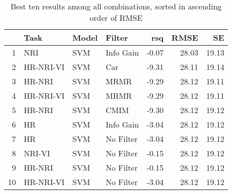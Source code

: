 \begin{table}[ht!]
\centering
\caption{Best ten results among all combinations, sorted in ascending order of RMSE} 
\label{tab:perf-top-10}
\begin{tabular}{rlllrrr}
  \hline
 & Task & Model & Filter & rsq & RMSE & SE \\ 
  \hline
1 & NRI & SVM & Info Gain & -0.07 & 28.03 & 19.13 \\ 
  2 & HR-NRI-VI & SVM & Car & -9.31 & 28.11 & 19.14 \\ 
  3 & HR-NRI & SVM & MRMR & -9.29 & 28.12 & 19.11 \\ 
  4 & HR-NRI-VI & SVM & MRMR & -9.29 & 28.12 & 19.11 \\ 
  5 & HR-NRI & SVM & CMIM & -9.30 & 28.12 & 19.12 \\ 
  6 & HR & SVM & Info Gain & -3.04 & 28.12 & 19.12 \\ 
  7 & HR & SVM & No Filter & -3.04 & 28.12 & 19.12 \\ 
  8 & NRI-VI & SVM & No Filter & -0.15 & 28.12 & 19.12 \\ 
  9 & HR-NRI & SVM & No Filter & -0.15 & 28.12 & 19.12 \\ 
  10 & HR-NRI-VI & SVM & No Filter & -3.04 & 28.12 & 19.12 \\ 
   \hline
\end{tabular}
\end{table}
